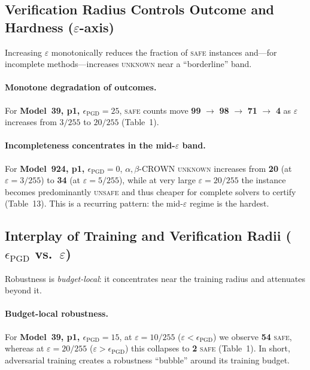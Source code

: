 \subsection{Verification Radius Controls Outcome and Hardness ($\varepsilon$-axis)}
Increasing $\varepsilon$ monotonically reduces the fraction of \textsc{safe} instances and---for incomplete methods---increases \textsc{unknown} near a ``borderline'' band.

\paragraph{Monotone degradation of outcomes.}
For \textbf{Model~39, p1, $\epsilon_{\mathrm{PGD}}{=}25$}, \textsc{safe} counts move \textbf{99} $\rightarrow$ \textbf{98} $\rightarrow$ \textbf{71} $\rightarrow$ \textbf{4} as $\varepsilon$ increases from $3/255$ to $20/255$ (Table~1).

\paragraph{Incompleteness concentrates in the mid-$\varepsilon$ band.}
For \textbf{Model~924, p1, $\epsilon_{\mathrm{PGD}}{=}0$}, $\alpha,\beta$-CROWN \textsc{unknown} increases from \textbf{20} (at $\varepsilon{=}3/255$) to \textbf{34} (at $\varepsilon{=}5/255$), while at very large $\varepsilon{=}20/255$ the instance becomes predominantly \textsc{unsafe} and thus cheaper for complete solvers to certify (Table~13). This is a recurring pattern: the mid-$\varepsilon$ regime is the hardest.

\subsection{Interplay of Training and Verification Radii ($\epsilon_{\mathrm{PGD}}$ vs.\ $\varepsilon$)}
Robustness is \emph{budget-local}: it concentrates near the training radius and attenuates beyond it.

\paragraph{Budget-local robustness.}
For \textbf{Model~39, p1, $\epsilon_{\mathrm{PGD}}{=}15$}, at $\varepsilon{=}10/255$ ($\varepsilon < \epsilon_{\mathrm{PGD}}$) we observe \textbf{54} \textsc{safe}, whereas at $\varepsilon{=}20/255$ ($\varepsilon > \epsilon_{\mathrm{PGD}}$) this collapses to \textbf{2} \textsc{safe} (Table~1). In short, adversarial training creates a robustness ``bubble'' around its training budget.

